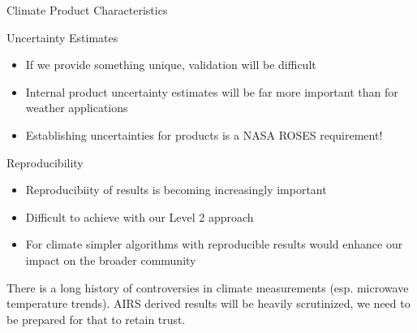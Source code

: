 \documentclass[10pt,t]{beamer}
\begin{document}
\begin{frame}[label={sec:orga98e52c},shrink=5]{Climate Product Characteristics}
\begin{block}{Uncertainty Estimates}
\begin{itemize}
\item If we provide something unique, validation will be difficult
\item Internal product uncertainty estimates will be far more important than for weather applications
\item Establishing uncertainties for products is a NASA ROSES requirement!
\end{itemize}
\end{block}

\begin{block}{Reproducibility}
\begin{itemize}
\item Reproducibiity of results is becoming increasingly important
\item Difficult to achieve with our Level 2 approach
\item For climate simpler algorithms with reproducible results would enhance our impact on the broader community
\end{itemize}

There is a long history of controversies in climate measurements (esp. microwave temperature trends).  AIRS derived results will be heavily scrutinized, we need to be prepared for that to retain trust.
\end{block}
\end{frame}
\end{document}
